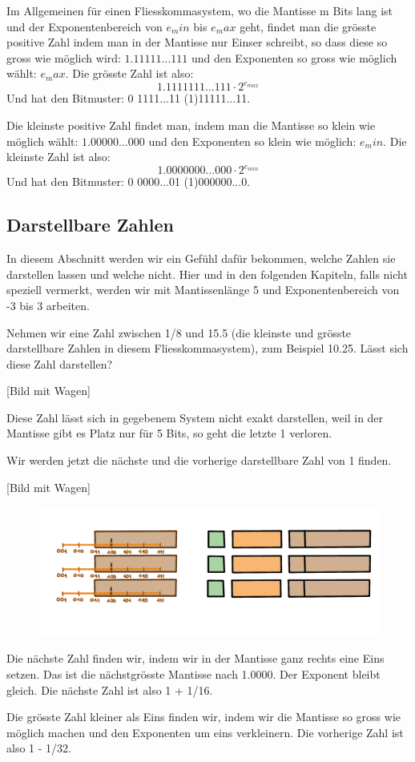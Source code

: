 Im Allgemeinen für einen Fliesskommasystem, wo die Mantisse m Bits lang ist und der Exponentenbereich von \(e_min\) bis \(e_max\) geht, findet man die grösste positive Zahl indem man in der Mantisse nur Einser schreibt, so dass diese so gross wie möglich wird: \(1.11111 \ldots 111\) und den Exponenten so gross wie möglich wählt: \(e_max\). Die grösste Zahl ist also:
\[1.1111111 \ldots 111 \cdot 2^{e_{max}}\]
Und hat den Bitmuster: 0 1111...11 (1)11111...11.

Die kleinste positive Zahl findet man, indem man die Mantisse so klein wie möglich wählt: \(1.00000 \ldots 000\) und den Exponenten so klein wie möglich: \(e_min\). Die kleinste Zahl ist also:
\[1.0000000 \ldots 000 \cdot 2^{e_{min}}\]
Und hat den Bitmuster: 0 0000...01 (1)000000...0.

\subsection{Darstellbare Zahlen}

In diesem Abschnitt werden wir ein Gefühl dafür bekommen, welche Zahlen sie darstellen lassen und welche nicht.
Hier und in den folgenden Kapiteln, falls nicht speziell vermerkt, werden wir mit Mantissenlänge 5 und Exponentenbereich von -3 bis 3 arbeiten.

\begin{beispiel}
Nehmen wir eine Zahl zwischen 1/8 und 15.5 (die kleinste und grösste darstellbare Zahlen in diesem Fliesskommasystem), zum Beispiel 10.25. Lässt sich diese Zahl darstellen?

[Bild mit Wagen]

Diese Zahl lässt sich in gegebenem System nicht exakt darstellen, weil in der Mantisse gibt es Platz nur für 5 Bits, so geht die letzte 1 verloren.
\end{beispiel}

\begin{beispiel}
Wir werden jetzt die nächste und die vorherige darstellbare Zahl von 1 finden.

[Bild mit Wagen]
\begin{figure}[H]
\centering
\includegraphics[width=\linewidth]{Pictures/Nachbarn.png} 
\end{figure}

Die nächste Zahl finden wir, indem wir in der Mantisse ganz rechts eine Eins setzen. Das ist die nächstgrösste Mantisse nach 1.0000. Der Exponent bleibt gleich. Die nächste Zahl ist also 1 + 1/16.

Die grösste Zahl kleiner als Eins finden wir, indem wir die Mantisse so gross wie möglich machen und den Exponenten um eins verkleinern. Die vorherige Zahl ist also 1 - 1/32.
\end{beispiel}

